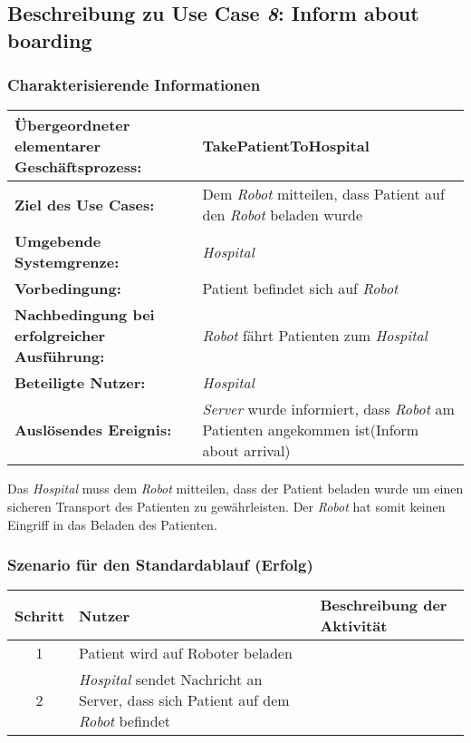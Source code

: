 	\pagebreak
		\subsection{Beschreibung zu Use Case \emph{8}: Inform about boarding}

			\subsubsection*{Charakterisierende Informationen}

			\begin{table}[H]
				\centering
				\begin{tabularx}{\textwidth}{@{}p{5cm}X@{}}
				\hline
				\textbf{Übergeordneter elementarer Geschäftsprozess:} & TakePatientToHospital   \\ \hline
				\textbf{Ziel des Use Cases:} & Dem \emph{Robot} mitteilen, dass Patient auf den \emph{Robot} beladen wurde \\ \hline
				\textbf{Umgebende Systemgrenze:} & \emph{Hospital} \\ \hline
				\textbf{Vorbedingung:} & Patient befindet sich auf \emph{Robot}\\ \hline
				\textbf{Nachbedingung bei erfolgreicher Ausführung:} & \emph{Robot} fährt Patienten zum \emph{Hospital} \\ \hline
				\textbf{Beteiligte Nutzer:} & \emph{Hospital}\\ \hline
				\textbf{Auslösendes Ereignis:} & \emph{Server} wurde informiert, dass \emph{Robot} am Patienten angekommen ist(Inform about arrival)\\
				\hline
				\end{tabularx}
			\end{table}
			
			Das \emph{Hospital} muss dem \emph{Robot} mitteilen, dass der Patient beladen wurde um einen sicheren Transport des Patienten zu gewährleisten. Der \emph{Robot} hat somit keinen Eingriff in das Beladen des Patienten.

			\subsubsection*{Szenario für den Standardablauf (Erfolg)}

			\begin{table}[H]
				\centering
				\begin{tabularx}{\textwidth}{@{}cp{2cm}X@{}}
				\hline
				Schritt & Nutzer & Beschreibung der Aktivität \\ \hline
				1 & Patient wird auf Roboter beladen \\
				2 & \emph{Hospital} sendet Nachricht an Server, dass sich Patient auf dem \emph{Robot} befindet \\
				\hline
				\end{tabularx}
			\end{table}


	\pagebreak
